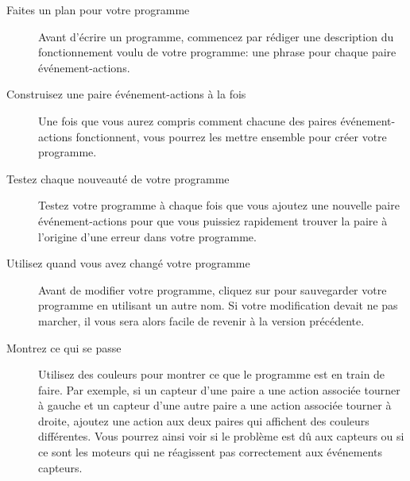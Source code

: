 \begin{description}

\item[Faites un plan pour votre programme]
Avant d'écrire un programme,
commencez par rédiger une description du fonctionnement voulu de votre programme:
une phrase pour chaque paire événement-actions.

\item[Construisez une paire événement-actions à la fois]
Une fois que vous aurez compris comment chacune des paires événement-actions fonctionnent,
vous pourrez les mettre ensemble pour créer votre programme.

\item[Testez chaque nouveauté de votre programme]
Testez votre programme à chaque fois que vous ajoutez une nouvelle paire événement-actions
pour que vous puissiez rapidement trouver la paire à l'origine d'une erreur dans votre programme.

\item[Utilisez  quand vous avez changé votre programme]
Avant de modifier votre programme, cliquez sur  pour sauvegarder votre programme
en utilisant un autre nom. Si votre modification devait ne pas marcher,
il vous sera alors facile de revenir à la version précédente.

\item[Montrez ce qui se passe]
Utilisez des couleurs pour montrer ce que le programme est en train de faire.
Par exemple, si un capteur d'une paire a une action associée tourner à gauche
et un capteur d'une autre paire a une action associée tourner à droite,
ajoutez une action aux deux paires qui affichent des couleurs différentes.
Vous pourrez ainsi voir si le problème est dû aux capteurs ou si ce sont les moteurs
qui ne réagissent pas correctement aux événements capteurs.

\end{description}



